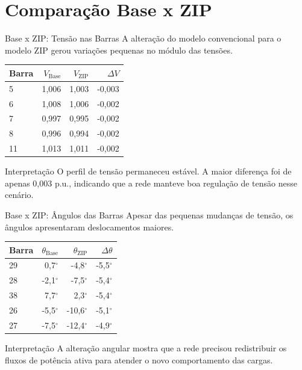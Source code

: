 \documentclass[aspectratio=169,11pt]{beamer}
\newcommand{\pu}{p.u.}
\begin{document}
\section{Comparação Base x ZIP}

\begin{frame}{Base x ZIP: Tensão nas Barras}
  A alteração do modelo convencional para o modelo ZIP gerou variações pequenas no módulo das tensões.

  \begin{table}
    \centering
    \small
    \begin{tabular}{lrrr}
      \toprule
      Barra & $V_{\text{Base}}$ & $V_{\text{ZIP}}$ & $\Delta V$ \\
      \midrule
      5 & 1,006 & 1,003 & -0,003 \\
      6 & 1,008 & 1,006 & -0,002 \\
      7 & 0,997 & 0,995 & -0,002 \\
      8 & 0,996 & 0,994 & -0,002 \\
      11 & 1,013 & 1,011 & -0,002 \\
      \bottomrule
    \end{tabular}
  \end{table}

  \begin{block}{Interpretação}
    O perfil de tensão permaneceu estável. A maior diferença foi de apenas 0,003 \pu, indicando que a rede manteve boa regulação de tensão nesse cenário.
  \end{block}
\end{frame}

\begin{frame}{Base x ZIP: Ângulos das Barras}
  Apesar das pequenas mudanças de tensão, os ângulos apresentaram deslocamentos maiores.

  \begin{table}
    \centering
    \small
    \begin{tabular}{lrrr}
      \toprule
      Barra & $\theta_{\text{Base}}$ & $\theta_{\text{ZIP}}$ & $\Delta\theta$ \\
      \midrule
      29 & 0,7$^\circ$ & -4,8$^\circ$ & -5,5$^\circ$ \\
      28 & -2,1$^\circ$ & -7,5$^\circ$ & -5,4$^\circ$ \\
      38 & 7,7$^\circ$ & 2,3$^\circ$ & -5,4$^\circ$ \\
      26 & -5,5$^\circ$ & -10,6$^\circ$ & -5,1$^\circ$ \\
      27 & -7,5$^\circ$ & -12,4$^\circ$ & -4,9$^\circ$ \\
      \bottomrule
    \end{tabular}
  \end{table}

  \begin{block}{Interpretação}
    A alteração angular mostra que a rede precisou redistribuir os fluxos de potência ativa para atender o novo comportamento das cargas.
  \end{block}
\end{frame}
\end{document}
